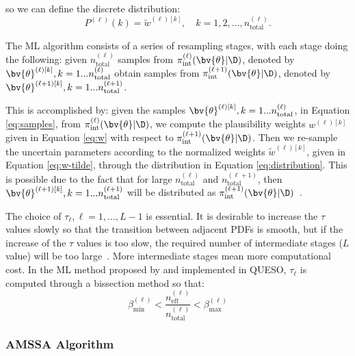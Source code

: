 so we can define the discrete distribution:
\begin{equation}
 \label{eq:distribution}
 P^{(\ell)}(k) = \tilde{w}^{(\ell) [k]} , \quad k=1,2,\ldots, n_\text{total}^{(\ell)}.
\end{equation}


The ML algorithm consists of a series of resampling stages, with each stage doing the following: given $n_\text{total}^{(\ell)}$ samples from $\pi_\text{int}^{(\ell)} (\bv{\theta}|\D)$, denoted by $\bv{\theta}^{(\ell)[k]}, k=1...n_\text{total}^{(\ell)}$ obtain samples from $\pi_\text{int}^{(\ell+1)} (\bv{\theta}|\D)$, denoted by
$\bv{\theta}^{(\ell+1)[k]}, k=1...n_\text{total}^{(\ell+1)}$. 

This is accomplished by: given the samples  $\bv{\theta}^{(\ell)[k]}, k=1...n_\text{total}^{(\ell)}$, in Equation \eqref{eq:samples}, from $\pi_\text{int}^{(\ell)} (\bv{\theta}|\D)$, we compute the plausibility weights $w^{(\ell) [k]}$ given in Equation \eqref{eq:w} with respect to $\pi_\text{int}^{(\ell+1)} (\bv{\theta}|\D)$. Then we re-sample the uncertain parameters according to the normalized weights $\tilde{w}^{(\ell) [k]}$, given in Equation \eqref{eq:w-tilde}, through the distribution in Equation \eqref{eq:distribution}. This is possible due to the fact that for large $n_\text{total}^{(\ell)}$ and $n_\text{total}^{(\ell+1)}$, then   $\bv{\theta}^{(\ell+1)[k]}, k=1...n_\text{total}^{(\ell+1)}$ will be distributed as $\pi_\text{int}^{(\ell+1)} (\bv{\theta}|\D)$~\cite{ChingChen2007}.

The choice of $\tau_\ell, \ell=1,\ldots,L-1$ is essential. It is desirable to increase the $\tau$ values slowly so that the transition between adjacent PDFs is smooth, but if the increase of the $\tau$ values is too slow, the required number of intermediate stages ($L$ value) will be too large~\cite{ChingChen2007}. More intermediate stages mean more computational cost.  In the ML method proposed by \cite{CheungPrudencio2012} and implemented in QUESO, $\tau_\ell$ is computed through a bissection method so that:
\begin{equation}\label{eq:tau}
\beta_\text{min}^{(\ell)}<\dfrac{n_\text{eff}^{(\ell)}}{n_\text{total}^{(\ell)}} <\beta_\text{max}^{(\ell)}
\end{equation}


\subsubsection{AMSSA Algorithm}

